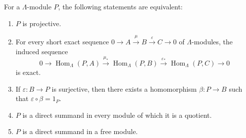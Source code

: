 For a $\Lambda$-module $P$, the following statements are equivalent:

\begin{enumerate}
\item[(1)] $P$ is projective.
\item[(2)] For every short exact sequence $0 \rightarrow A \xrightarrow{\mu} B \xrightarrow{\varepsilon} C \rightarrow 0$ of $\Lambda$-modules, the induced sequence
  $$0 \rightarrow \operatorname{Hom}_{\Lambda}(P, A) \xrightarrow{\mu_*} \operatorname{Hom}_{\Lambda}(P, B) \xrightarrow{\varepsilon_*} \operatorname{Hom}_{\Lambda}(P, C) \rightarrow 0$$
  is exact.
\item[(3)] If $\varepsilon : B \rightarrow P$ is surjective, then there exists a homomorphism $\beta : P \rightarrow B$ such that $\varepsilon \circ \beta = 1_P$.
\item[(4)] $P$ is a direct summand in every module of which it is a quotient.
\item[(5)] $P$ is a direct summand in a free module.
\end{enumerate}

